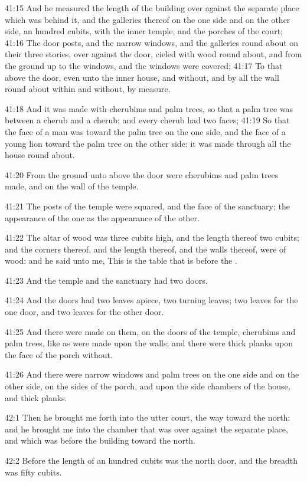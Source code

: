 41:15 And he measured the length of the building over against the separate place which was behind it, and the galleries thereof on the one side and on the other side, an hundred cubits, with the inner temple, and the porches of the court; 41:16 The door posts, and the narrow windows, and the galleries round about on their three stories, over against the door, cieled with wood round about, and from the ground up to the windows, and the windows were covered; 41:17 To that above the door, even unto the inner house, and without, and by all the wall round about within and without, by measure.

41:18 And it was made with cherubims and palm trees, so that a palm tree was between a cherub and a cherub; and every cherub had two faces; 41:19 So that the face of a man was toward the palm tree on the one side, and the face of a young lion toward the palm tree on the other side: it was made through all the house round about.

41:20 From the ground unto above the door were cherubims and palm trees made, and on the wall of the temple.

41:21 The posts of the temple were squared, and the face of the sanctuary; the appearance of the one as the appearance of the other.

41:22 The altar of wood was three cubits high, and the length thereof two cubits; and the corners thereof, and the length thereof, and the walls thereof, were of wood: and he said unto me, This is the table that is before the \LORD.

41:23 And the temple and the sanctuary had two doors.

41:24 And the doors had two leaves apiece, two turning leaves; two leaves for the one door, and two leaves for the other door.

41:25 And there were made on them, on the doors of the temple, cherubims and palm trees, like as were made upon the walls; and there were thick planks upon the face of the porch without.

41:26 And there were narrow windows and palm trees on the one side and on the other side, on the sides of the porch, and upon the side chambers of the house, and thick planks.

42:1 Then he brought me forth into the utter court, the way toward the north: and he brought me into the chamber that was over against the separate place, and which was before the building toward the north.

42:2 Before the length of an hundred cubits was the north door, and the breadth was fifty cubits.

